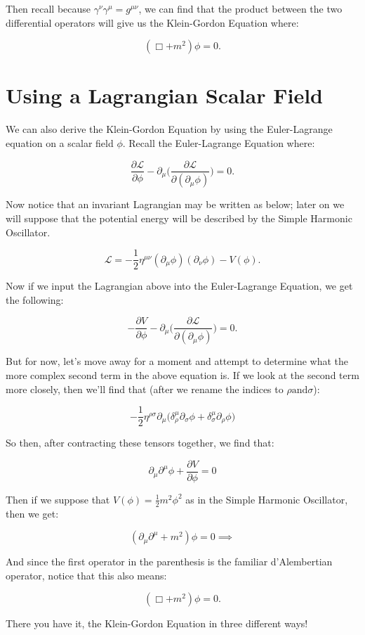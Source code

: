\documentclass[parskip=full]{article}
\begin{document}
Then recall because $\gamma^{\nu}\gamma^{\mu} = g^{\mu\nu}$, we can find that the product between the two differential operators will give us the Klein-Gordon Equation where:

\[
    (\Box + m^2)\phi = 0
.\]

\section{Using a Lagrangian Scalar Field}
We can also derive the Klein-Gordon Equation by using the Euler-Lagrange equation on a scalar field $\phi$. Recall the Euler-Lagrange Equation where:

\[
    \frac{\partial\mathcal{L}}{\partial \phi} - \partial_{\mu} \Bigg( \frac{\partial\mathcal{L}}{\partial(\partial_{\mu}\phi)}  \Bigg) = 0 
.\] 

Now notice that an invariant Lagrangian may be written as below; later on we will suppose that the potential energy will be described by the Simple Harmonic Oscillator.

\[
    \mathcal{L} = - \frac{1}{2} \eta^{\mu\nu} (\partial_{\mu}\phi)(\partial_{\nu}\phi) - V(\phi) 
.\] 

Now if we input the Lagrangian above into the Euler-Lagrange Equation, we get the following:

\[
    - \frac{\partial V}{\partial \phi} - \partial_{\mu} \Bigg(\frac{\partial\mathcal{L}}{\partial(\partial_{\mu}\phi)}\Bigg) = 0
.\] 

But for now, let's move away for a moment and attempt to determine what the more complex second term in the above equation is. If we look at the second term more closely, then we'll find that (after we rename the indices to $\rho \text{and} \sigma$):

\[
    - \frac{1}{2} \eta^{\rho\sigma} \partial_{\mu} \Bigg(\delta^{\mu}_{\rho}\partial_{\sigma}\phi + \delta^{\mu}_{\sigma} \partial_{\rho}\phi \Bigg)
\] 

So then, after contracting these tensors together, we find that:

\[
    \partial_{\mu} \partial^{\mu}\phi + \frac{\partial V}{\partial \phi} = 0 
\] 

Then if we suppose that $V(\phi) = \frac{1}{2} m^2 \phi^2$ as in the Simple Harmonic Oscillator, then we get:

\[
    (\partial_{\mu} \partial^{\mu} + m^2)\phi = 0 \implies
\] 

And since the first operator in the parenthesis is the familiar d'Alembertian operator, notice that this also means:

\[
    (\Box + m^2)\phi = 0
.\] 

There you have it, the Klein-Gordon Equation in three different ways!
\end{document}
